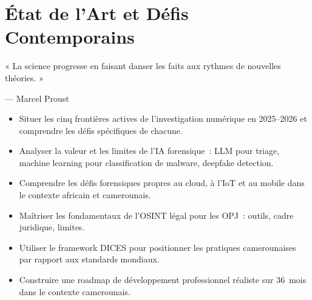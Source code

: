 
\chapter{État de l'Art et Défis Contemporains}
\label{chap:etat-art}

\epigraph{%
    « La science progresse en faisant danser les faits aux rythmes
    de nouvelles théories. »%
}{--- Marcel Proust}


\begin{boxobjectifs}
\begin{itemize}
    \item Situer les cinq frontières actives de l'investigation numérique
          en 2025--2026 et comprendre les défis spécifiques de chacune.
    \item Analyser la valeur et les limites de l'IA forensique~: LLM pour
          triage, machine learning pour classification de malware,
          deepfake detection.
    \item Comprendre les défis forensiques propres au cloud, à l'IoT et
          au mobile dans le contexte africain et camerounais.
    \item Maîtriser les fondamentaux de l'OSINT légal pour les OPJ~:
          outils, cadre juridique, limites.
    \item Utiliser le framework DICES pour positionner les pratiques
          camerounaises par rapport aux standards mondiaux.
    \item Construire une roadmap de développement professionnel réaliste
          sur 36~mois dans le contexte camerounais.
\end{itemize}
\end{boxobjectifs}

\bigskip


